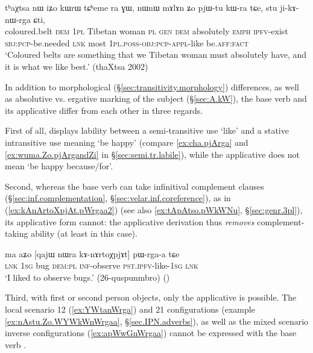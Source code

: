\begin{exe}
\ex \label{ex:stu.jikAnWrga.Cti}
\gll tʰaχtsa nɯ iʑo kɯrɯ tɕʰeme ra ɣɯ, nɯnɯ mɤlɤn ʑo pjɯ-tu kɯ-ra tɕe, stu ji-kɤ-nɯ-rga ɕti, \\
coloured.belt \textsc{dem} \textsc{1pl} Tibetan woman \textsc{pl} \textsc{gen} \textsc{dem} absolutely \textsc{emph} \textsc{ipfv}-exist \textsc{sbj}:\textsc{pcp}-be.needed \textsc{lnk} most \textsc{1pl}.\textsc{poss}-\textsc{obj}:\textsc{pcp}-\textsc{appl}-like be.\textsc{aff}:\textsc{fact} \\
\glt `Coloured belts are something that we Tibetan woman must absolutely have, and it is what we like best.' (thaXtsa 2002)
\end{exe}

In addition to morphological (§\ref{sec:transitivity.morphology}) differences, as well as absolutive vs. ergative marking of the subject (§\ref{sec:A.kW}), the base verb  and its applicative  differ from each other in three regards. 

First of all,  displays lability between a semi-transitive use `like' and a stative intransitive use meaning `be happy' (compare \ref{ex:cha.pjArga} and \ref{ex:wuma.Zo.pjArgandZi} in §\ref{sec:semi.tr.labile}), while the applicative  does not mean `be happy because/for'.

Second, whereas the base verb  can take infinitival complement clauses (§\ref{sec:inf.complementation}, §\ref{sec:velar.inf.coreference}), as in (\ref{ex:kAnArtoXpjAt.pWrgaa2}) (see also \ref{ex:tApAtso.pWkWNu}, §\ref{sec:genr.3pl}), its applicative form  cannot: the applicative derivation thus \textit{removes} com\-ple\-ment-taking ability (at least in this case).

\begin{exe}
\ex \label{ex:kAnArtoXpjAt.pWrgaa2}
\gll ma aʑo [qajɯ nɯra kɤ-nɤrtoχpjɤt] pɯ-rga-a tɕe  \\
\textsc{lnk} \textsc{1sg} bug \textsc{dem}:\textsc{pl} \textsc{inf}-observe \textsc{pst}.\textsc{ipfv}-like-\textsc{1sg} \textsc{lnk} \\
\glt `I liked to observe bugs.' (26-quspunmbro)
()
\end{exe}

Third, with first or second person objects, only the applicative  is possible. The local scenario 1\fl{}2 (\ref{ex:YWtanWrga}) and 2\fl{}1 configurations (example \ref{ex:nAstu.Zo.WYWkWnWrgaa}, §\ref{sec.IPN.adverbs}), as well as the mixed scenario inverse configurations (\ref{ex:apWwGnWrgaa}) cannot be expressed with the base verb . 

